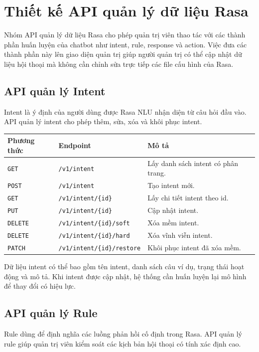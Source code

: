 \section{Thiết kế API quản lý dữ liệu Rasa}

Nhóm API quản lý dữ liệu Rasa cho phép quản trị viên thao tác với các thành phần huấn luyện của chatbot như intent, rule, response và action. Việc đưa các thành phần này lên giao diện quản trị giúp người quản trị có thể cập nhật dữ liệu hội thoại mà không cần chỉnh sửa trực tiếp các file cấu hình của Rasa.

\subsection{API quản lý Intent}

Intent là ý định của người dùng được Rasa NLU nhận diện từ câu hỏi đầu vào. API quản lý intent cho phép thêm, sửa, xóa và khôi phục intent.

\begin{longtable}{|p{3cm}|p{5cm}|p{7cm}|}
\hline
\textbf{Phương thức} & \textbf{Endpoint} & \textbf{Mô tả} \\
\hline
\texttt{GET} & \texttt{/v1/intent} & Lấy danh sách intent có phân trang. \\
\hline
\texttt{POST} & \texttt{/v1/intent} & Tạo intent mới. \\
\hline
\texttt{GET} & \texttt{/v1/intent/\{id\}} & Lấy chi tiết intent theo id. \\
\hline
\texttt{PUT} & \texttt{/v1/intent/\{id\}} & Cập nhật intent. \\
\hline
\texttt{DELETE} & \texttt{/v1/intent/\{id\}/soft} & Xóa mềm intent. \\
\hline
\texttt{DELETE} & \texttt{/v1/intent/\{id\}/hard} & Xóa vĩnh viễn intent. \\
\hline
\texttt{PATCH} & \texttt{/v1/intent/\{id\}/restore} & Khôi phục intent đã xóa mềm. \\
\hline
\end{longtable}

Dữ liệu intent có thể bao gồm tên intent, danh sách câu ví dụ, trạng thái hoạt động và mô tả. Khi intent được cập nhật, hệ thống cần huấn luyện lại mô hình để thay đổi có hiệu lực.

\subsection{API quản lý Rule}

Rule dùng để định nghĩa các luồng phản hồi cố định trong Rasa. API quản lý rule giúp quản trị viên kiểm soát các kịch bản hội thoại có tính xác định cao.

